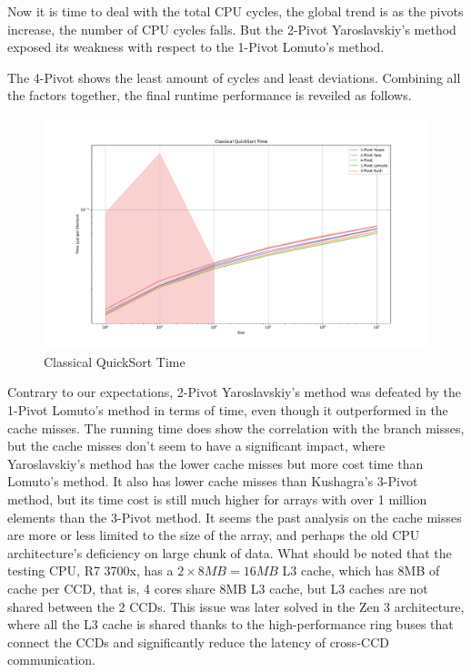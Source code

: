 \documentclass{article}
\newcommand{\bigO}{\mathcal{O}}
\begin{document}
Now it is time to deal with the total CPU cycles, the global trend is as the pivots increase, the number of CPU cycles falls.
But the 2-Pivot Yaroslavskiy's method exposed its weakness with respect to the 1-Pivot Lomuto's method. 

The 4-Pivot shows the least amount of cycles and least deviations. Combining all the factors together, the final runtime performance is reveiled as follows.

\begin{figure}[H]
    \hypertarget{fig:classicaltime}{}
    \caption{Classical QuickSort Time}
    \centering
    \hspace*{-0.27\textwidth}
    \includegraphics[width=1.5\textwidth]{Classical QuickSort Time.pdf}
\end{figure}


Contrary to our expectations, 2-Pivot Yaroslavskiy's method was defeated by the 1-Pivot Lomuto's method in terms of time, even though it outperformed in the cache misses.
The running time does show the correlation with the branch misses, but the cache misses don't seem to have a significant impact, where Yaroslavskiy's method has the lower cache misses but more cost time than Lomuto's method.
It also has lower cache misses than Kushagra's 3-Pivot method, but its time cost is still much higher for arrays with over 1 million elements than the 3-Pivot method.
It seems the past analysis on the cache misses are more or less limited to the size of the array, and perhaps the old CPU architecture's deficiency on large chunk of data.
What should be noted that the testing CPU, R7 3700x, has a $2 \times 8MB = 16MB$ L3 cache, which has 8MB of cache per CCD, that is, 4 cores share 8MB L3 cache, but L3 caches are not shared between the 2 CCDs.
This issue was later solved in the Zen 3 architecture, where all the L3 cache is shared thanks to the high-performance ring buses that connect the CCDs and significantly reduce the latency of cross-CCD communication.
\end{document}
